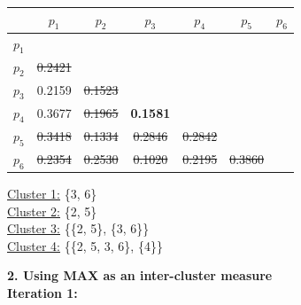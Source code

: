 \documentclass[11pt]{article}
\begin{document}
	\begin{center}
    	\begin{adjustbox}{max width=\textwidth}
		\begin{tabular}{ | c | c | c | c | c | c | c |}
	  	 	\hline

	  	 	& \textbf{$p_1$} & \textbf{$p_2$} & \textbf{$p_3$} & \textbf{$p_4$} & \textbf{$p_5$} & \textbf{$p_6$}\\
	  	 	\hline
	  	 	
	  	 	\textbf{$p_1$} &  &  &  &  &  &\\
	  	 	\hline
	  	 	
	  	 	\textbf{$p_2$} & \st{0.2421} &  &  &  &  &  \\
	  	 	\hline
	  	 	
	  	 	\textbf{$p_3$} & 0.2159 & \st{0.1523} &  &  &  & \\
	  	 	\hline
	  	 	
	  	 	\textbf{$p_4$} & 0.3677 & \st{0.1965} & \textbf{0.1581} &  &  & \\
	  	 	\hline
	  	 	
	  	 	\textbf{$p_5$} & \st{0.3418} & \st{0.1334} & \st{0.2846} & \st{0.2842} &  & \\
	  	 	\hline	
	  	 	
	  	 	\textbf{$p_6$} & \st{0.2354} & \st{0.2530} & \st{0.1020} & \st{0.2195} & \st{0.3860} & \\
	  	 	\hline			
    		\end{tabular}
    	\end{adjustbox}
	\end{center}
	
	\underline{Cluster 1:} \{3, 6\} \\
	\underline{Cluster 2:} \{2, 5\} \\
	\underline{Cluster 3:} \{\{2, 5\}, \{3, 6\}\} \\
	\underline{Cluster 4:} \{\{2, 5, 3, 6\}, \{4\}\}
	\newpage
	
	
	
	\textbf{2. Using MAX as an inter-cluster measure} \\
	
	\textbf{Iteration 1:}
	
\end{document}
